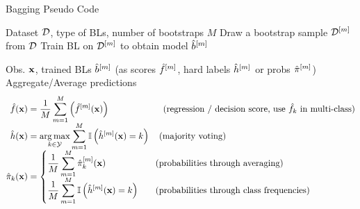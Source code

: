 \documentclass[11pt,compress,t,notes=noshow, xcolor=table]{beamer}
\begin{document}
\begin{vbframe}{Bagging Pseudo Code}
\vspace{-2ex}
\begin{algorithm}[H]
  \scriptsize
  \caption*{Bagging algorithm: Training}
  \begin{algorithmic}[1]
     Dataset $\mathcal{D}$, type of BLs, number of bootstraps $M$
      \State Draw a bootstrap sample $\mathcal{D}^{[m]}$ from $\mathcal{D}$
      \State Train BL on $\mathcal{D}^{[m]}$ to obtain model $\hat{b}^{[m]}$
    \EndFor
  \end{algorithmic}
\end{algorithm}
\vspace{-0.7cm}
\begin{algorithm}[H]
  \scriptsize
  \caption*{Bagging algorithm: Prediction}
  \begin{algorithmic}[1]
     Obs. $\mathbf{x}$, trained BLs $\hat{b}^{[m]}$ (as scores $\hat{f}^{[m]}$, hard labels $\hat{h}^{[m]}$ or probs $\hat \pi^{[m]}$)
    \State Aggregate/Average predictions
    \vspace{-2ex}
    \begin{align*}
      \hat{f}(\mathbf{x}) &= \frac{1}{M} \sum_{m=1}^M \left(\hat{f}^{[m]}(\mathbf{x})\right) \qquad \qquad \qquad \text{(regression / decision score, use $\hat{f}_k$ in multi-class)} \\[-1ex]
      \hat{h}(\mathbf{x}) &= \operatorname*{arg\,max}_{k \in \mathcal{Y}} \sum_{m=1}^M \mathbb{I} \left(\hat{h}^{[m]}(\mathbf{x}) = k\right) \quad \text{(majority voting)} \\[-1ex]
    \hat \pi_{k}(\mathbf{x}) &=
    \left\{
    \begin{aligned}
    & \frac{1}{M} \sum_{m=1}^M \hat \pi_{k}^{[m]}(\mathbf{x}) \quad && \text{(probabilities through averaging)} \\[-1ex]
    & \frac{1}{M} \sum_{m=1}^M \mathbb{I} \left(\hat{h}^{[m]}(\mathbf{x}) = k \right) \quad && \text{(probabilities through class frequencies)}
    \end{aligned}
    \right.
    \end{align*}
    \vspace{-3ex}
  \end{algorithmic}
\end{algorithm}
\vspace{-3ex}
\end{vbframe}
\end{document}
